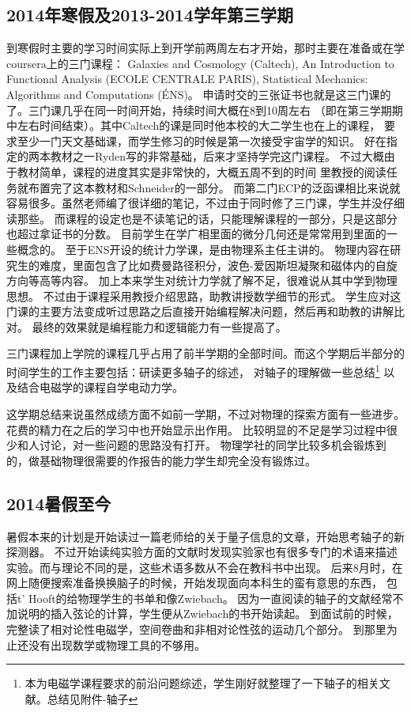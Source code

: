 \documentclass[10pt,a4paper]{article}
\begin{document}
\begin{spacing}{1.6}
\subsection{2014年寒假及2013-2014学年第三学期}
到寒假时主要的学习时间实际上到开学前两周左右才开始，那时主要在准备或在学coursera上的三门课程：
Galaxies and Cosmology (Caltech),  
An Introduction to Functional Analysis (ECOLE  CENTRALE  PARIS),  
Statistical Mechanics: Algorithms and Computations (ÉNS)。 
申请时交的三张证书也就是这三门课的了。三门课几乎在同一时间开始，持续时间大概在8到10周左右
（即在第三学期期中左右时间结束）。其中Caltech的课是同时他本校的大二学生也在上的课程，
要求至少一门天文基础课，而学生修习的时候是第一次接受宇宙学的知识。
好在指定的两本教材之一Ryden\cite{ryde-co}写的非常基础，后来才坚持学完这门课程。
不过大概由于教材简单，课程的进度其实是非常快的，大概五周不到的时间
里教授的阅读任务就布置完了这本教材和Schneider\cite{schn-ea}的一部分。
而第二门ECP的泛函课相比来说就容易很多。虽然老师编了很详细的笔记，不过由于同时修了三门课，学生并没仔细读那些。
而课程的设定也是不读笔记的话，只能理解课程的一部分，只是这部分也超过拿证书的分数。
目前学生在学广相里面的微分几何还是常常用到里面的一些概念的。
至于ENS开设的统计力学课，是由物理系主任主讲的。
物理内容在研究生的难度，里面包含了比如费曼路径积分，波色-爱因斯坦凝聚和磁体内的自旋方向等高等内容。
加上本来学生对统计力学就了解不足，很难说从其中学到物理思想。
不过由于课程采用教授介绍思路，助教讲授数学细节的形式。
学生应对这门课的主要方法变成听过思路之后直接开始编程解决问题，然后再和助教的讲解比对。
最终的效果就是编程能力和逻辑能力有一些提高了。\par
三门课程加上学院的课程几乎占用了前半学期的全部时间。而这个学期后半部分的时间学生的工作主要包括：研读更多轴子的综述，
对轴子的理解做一些总结\footnote{本为电磁学课程要求的前沿问题综述，学生刚好就整理了一下轴子的相关文献。总结见附件-轴子}
以及结合电磁学的课程自学电动力学\cite{grif-em}。\par
这学期总结来说虽然成绩方面不如前一学期，不过对物理的探索方面有一些进步。花费的精力在之后的学习中也开始显示出作用。
比较明显的不足是学习过程中很少和人讨论，对一些问题的思路没有打开。
物理学社的同学比较多机会锻炼到的，做基础物理很需要的作报告的能力学生却完全没有锻炼过。
\subsection{2014暑假至今}
暑假本来的计划是开始读过一篇老师给的关于量子信息的文章，开始思考轴子的新探测器。
不过开始读纯实验方面的文献时发现实验家也有很多专门的术语来描述实验。而与理论不同的是，这些术语多数从不会在教科书中出现。
后来8月时，在网上随便搜索准备换换脑子的时候，开始发现面向本科生的蛮有意思的东西，
包括t' Hooft的给物理学生的书单\cite{hoof-ph}和像Zwiebach\cite{zwie-st}。
因为一直阅读的轴子的文献经常不加说明的插入弦论的计算，学生便从Zwiebach的书开始读起。
到面试前的时候，完整读了相对论性电磁学，空间卷曲和非相对论性弦的运动几个部分。
到那里为止还没有出现数学或物理工具的不够用。


\end{spacing}
\end{document}
